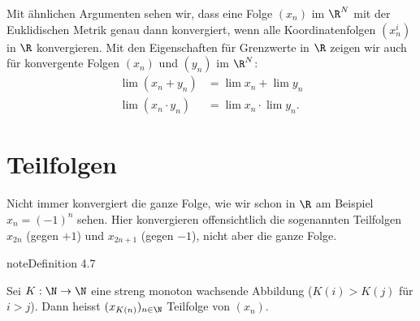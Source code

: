 \documentclass[letterpaper,10pt,english]{jupyterBook}
\begin{document}
Mit ähnlichen Argumenten sehen wir, dass eine Folge \((x_n)\) im \(\R^N\) mit der Euklidischen Metrik genau dann konvergiert, wenn alle Koordinatenfolgen \((x_n^{i})\) in \(\R\) konvergieren. Mit den Eigenschaften für Grenzwerte in \(\R\) zeigen wir auch für konvergente Folgen \((x_n)\) und \((y_n)\) im \(\R^N\):
\begin{align*}
\lim (x_n + y_n) &= \lim x_n + \lim y_n \\
\lim (x_n \cdot y_n) &= \lim x_n \cdot \lim y_n.
\end{align*}

\section{Teilfolgen}
\label{\detokenize{metrik/teilfolgen:teilfolgen}}\label{\detokenize{metrik/teilfolgen::doc}}
Nicht immer konvergiert die ganze Folge, wie wir schon in \(\R\) am Beispiel \(x_n = (-1)^n\) sehen. Hier konvergieren offensichtlich die sogenannten Teilfolgen \(x_{2n}\) (gegen \(+1\)) und \(x_{2n+1}\) (gegen \(-1\)), nicht aber die ganze Folge.
\label{metrik/teilfolgen:definition-0}
\begin{sphinxadmonition}{note}{Definition 4.7}



Sei \(K: \N \rightarrow \N\) eine streng monoton wachsende Abbildung (\(K(i) > K(j)\) für \(i > j\)). Dann heisst \((x_{K(n)})_{n \in \N}\) Teilfolge von \((x_n). \)
\end{sphinxadmonition}
\end{document}
